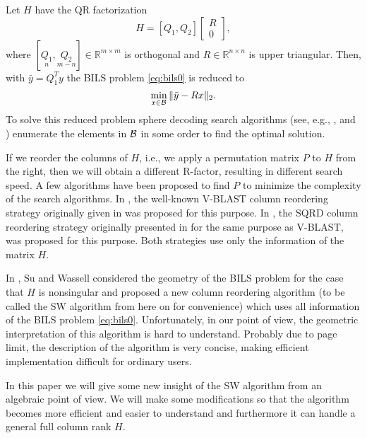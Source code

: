 \documentclass[conference]{IEEEtran}
\newcommand{\bmx}{\begin{bmatrix}}
\newcommand{\emx}{\end{bmatrix}}
\newcommand{\be}{\begin{equation}}
\newcommand{\ee}{\end{equation}}
\newcommand{\by}{{\bar{y}}}
\begin{document}
Let $H$ have the QR factorization
$$
H=[Q_1, Q_2] \bmx R \\ 0 \emx,
$$
where $[\underset{n}{Q_1}, \underset{m-n}{Q_2}]  \in \mathbb{R}^{m\times m}$ is orthogonal
and $R\in \mathbb{R}^{n\times n}$ is upper triangular. 
Then, with $\bar{y}=Q_1^Ty$ %
the BILS problem \eqref{eq:bils0} is reduced to 
\be \label{eq:bils}
 \min_{x \in  {\cal B}}  \| \by- Rx \|_2.
\ee
To solve this reduced problem sphere decoding search algorithms (see, e.g.,  \cite{DamGC03}, \cite{BouGBF03}
and  \cite{ChaH05}) enumerate  the elements in ${\cal B}$ in some order
to find the optimal solution. 

If we reorder the columns of $H$,  i.e., we apply a permutation matrix $P$ to $H$ from the right,
then we will obtain a different R-factor,  resulting in different search speed.
A few algorithms have been proposed to
find $P$ to minimize the complexity of the search
algorithms. In \cite{DamGC03}, the well-known V-BLAST column reordering strategy
originally given in \cite{FosGVW99} was proposed for this purpose.
In \cite{ChaH05}, the SQRD column reordering strategy originally 
presented in \cite{WubBRKK01} for the same purpose as V-BLAST,
was proposed for this purpose.
Both strategies use only the information of the matrix $H$.

In \cite{SuW05}, Su and Wassell considered the geometry of the BILS
problem for the case that $H$ is nonsingular and proposed a new column reordering algorithm (to be called
the SW algorithm from here on for convenience) which uses all information of the BILS problem \eqref{eq:bils0}.
Unfortunately, in our point of view, the geometric interpretation of this algorithm is hard to understand.
Probably due to page limit, the description of the algorithm is very concise, 
making efficient implementation difficult for ordinary users. 

In this paper we will give some new insight of the SW algorithm from an algebraic point of view.
We will make some modifications so that the algorithm becomes more efficient
and easier to understand and furthermore it can handle a general full column rank $H$.
\end{document}
